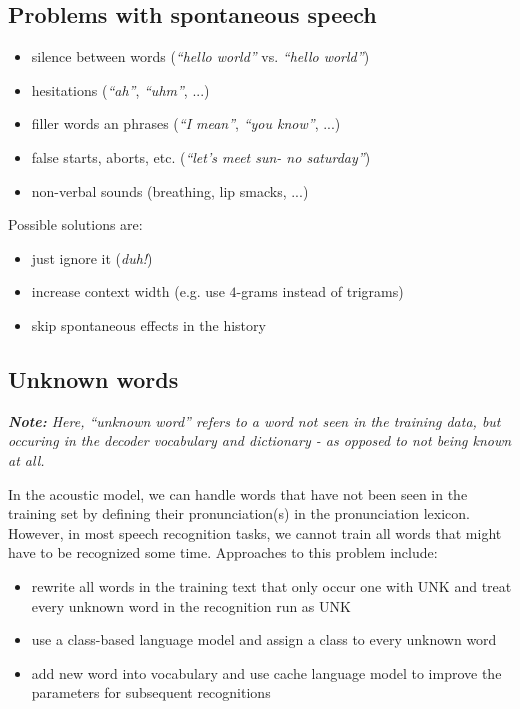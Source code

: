 \documentclass[11pt]{article}
\begin{document}
\subsection{Problems with spontaneous speech}
\begin{itemize}
    \item silence between words (\textit{``hello world''} vs. \textit{``hello \hspace{5pt} world''})
    \item hesitations (\textit{``ah''}, \textit{``uhm''}, ...)
    \item filler words an phrases (\textit{``I mean''}, \textit{``you know''}, ...)
    \item false starts, aborts, etc. (\textit{``let's meet sun- no saturday''})
    \item non-verbal sounds (breathing, lip smacks, ...)
\end{itemize}

Possible solutions are:
\begin{itemize}
    \item just ignore it (\textit{duh!})
    \item increase context width (e.g. use $4$-grams instead of trigrams)
    \item skip spontaneous effects in the history
\end{itemize}

\subsection{Unknown words}

\vspace{5pt}
\textit{\textbf{Note:} Here, ``unknown word'' refers to a word not seen in the training data, but occuring in the decoder vocabulary and dictionary - as opposed to not being known at all.}
\vspace{10pt}

In the acoustic model, we can handle words that have not been seen in the training set by defining their pronunciation(s) in the pronunciation lexicon. However, in most speech recognition tasks, we cannot train all words that might have to be recognized some time. Approaches to this problem include:
\begin{itemize}
    \item rewrite all words in the training text that only occur one with UNK and treat every unknown word in the recognition run as UNK
    \item use a class-based language model and assign a class to every unknown word
    \item add new word into vocabulary and use cache language model to improve the parameters for subsequent recognitions
\end{itemize}
\end{document}
